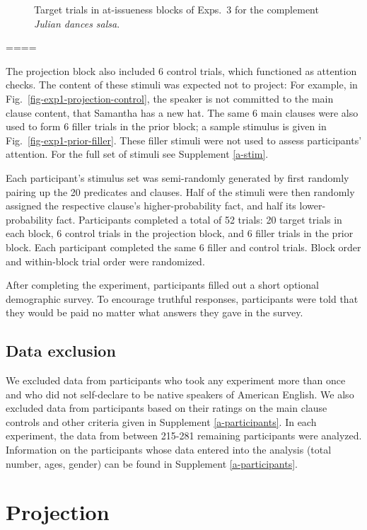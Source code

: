 \documentclass[11pt,fleqn]{article}
\newcommand{\6}{\mbox{$[\hspace*{-.6mm}[$}}
\newcommand{\9}{\mbox{$]\hspace*{-.6mm}]$}}
\begin{document}
\begin{figure}[h!]
\caption{Target trials in at-issueness blocks of Exps.~3 for the complement {\em Julian dances salsa}.}\label{fig:ai-exps3}
\end{figure}


====

The projection block also included 6 control trials, which functioned as attention checks. The content of these stimuli was expected not to project: For example, in Fig.~\ref{fig-exp1-projection-control}, the speaker is not committed to the main clause content, that Samantha has a new hat. The same 6 main clauses were also used to form 6 filler trials in the prior block; a sample stimulus is given in Fig.~\ref{fig-exp1-prior-filler}. These filler stimuli were not used to assess participants' attention. For the full set of stimuli see Supplement \ref{a-stim}.


Each participant's stimulus set was semi-randomly generated by first randomly pairing up the 20 predicates and clauses. Half of the stimuli were then randomly assigned the respective clause's higher-probability fact, and half its lower-probability fact. Participants completed a total of 52 trials: 20 target trials in each block, 6 control trials in the projection block, and 6 filler trials in the prior block. Each participant completed the same 6 filler and control trials. Block order and within-block trial order were randomized.

After completing the experiment, participants filled out a short optional demographic survey. To encourage truthful responses, participants were told that they would be paid no matter what answers they gave in the survey.

\subsection{Data exclusion} 

We excluded data from participants who took any experiment more than once and who did not self-declare to be native speakers of American English. We also excluded data from participants based on their ratings on the main clause controls and other criteria given in Supplement \ref{a-participants}. In each experiment, the data from between 215-281 remaining participants were analyzed. Information on the participants whose data entered into the analysis (total number, ages, gender) can be found in Supplement \ref{a-participants}.

\newpage

\section{Projection}
\end{document}

